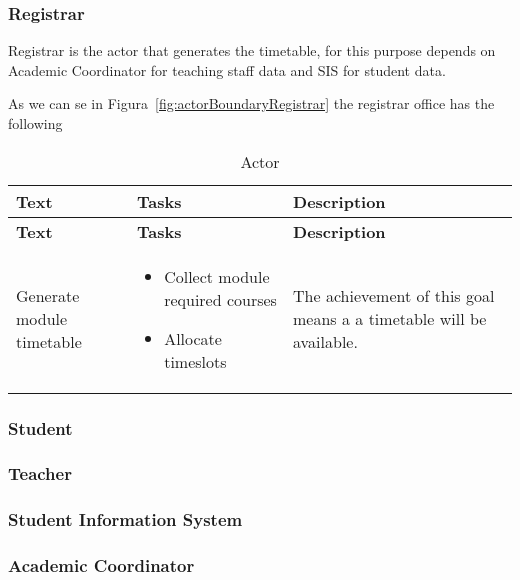 \subsubsection{Registrar}
Registrar is the actor that generates the timetable, for this purpose depends on Academic Coordinator for teaching staff data and SIS for student data.

As we can se in Figura~\ref{fig:actorBoundaryRegistrar} the registrar office has the following
\begin{longtable}{p{2in}|p{2in}|p{2in}}
\caption{Actor} \label{tab:i-star} \\
\hline
\textbf{Text} & \textbf{Tasks} &  \textbf{Description}\\
\hline
\endfirsthead
\hline
\textbf{Text} & \textbf{Tasks} &  \textbf{Description}\\
\hline
\endhead
\hline
\endfoot

Generate module timetable &
\begin{itemize}
	\item Collect module required courses
	\item Allocate timeslots
\end{itemize} &
The achievement of this goal means a a timetable will be available.
\\\hline
\end{longtable}

%


\subsubsection{Student}
\subsubsection{Teacher}
\subsubsection{Student Information System}
\subsubsection{Academic Coordinator}
